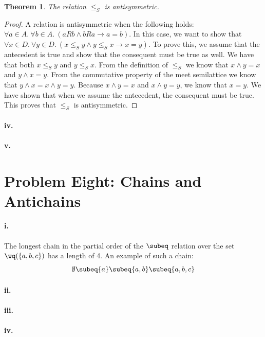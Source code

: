 \documentclass[10pt,letter]{article}
\newtheorem*{thm}{Theorem}
\begin{document}
\begin{thm} The relation $\le_S$ is antisymmetric. \end{thm}
\begin{proof} A relation is antisymmetric when the following holds: $\forall a \in A .\ \forall b \in A .\ (aRb \wedge bRa \rightarrow a = b)$. In this case, we want to show that $\forall x \in D .\ \forall y \in D .\ (x \le_S y \wedge y \le_S x \rightarrow x = y)$. To prove this, we assume that the antecedent is true and show that the consequent must be true as well. We have that both $x \le_S y$ and $y \le_S x$. From the definition of $\le_S$ we know that $x \wedge y = x$ and $y \wedge x = y$. From the commutative property of the meet semilattice we know that $y \wedge x = x \wedge y = y$. Because $x \wedge y = x$ and $x \wedge y = y$, we know that $x = y$. We have shown that when we assume the antecedent, the consequent must be true. This proves that $\le_S$ is antisymmetric.
\end{proof}

\paragraph{iv.}
\paragraph{v.}

\section*{Problem Eight: Chains and Antichains}

\paragraph{i.} The longest chain in the partial order of the $\subeq$ relation over the set $\wq(\{a, b, c\})$ has a length of 4. An example of such a chain:
$$\emptyset \subeq \{a\} \subeq \{a, b\} \subeq \{a, b, c\}$$

\paragraph{ii.}
\paragraph{iii.}
\paragraph{iv.}
\end{document}
